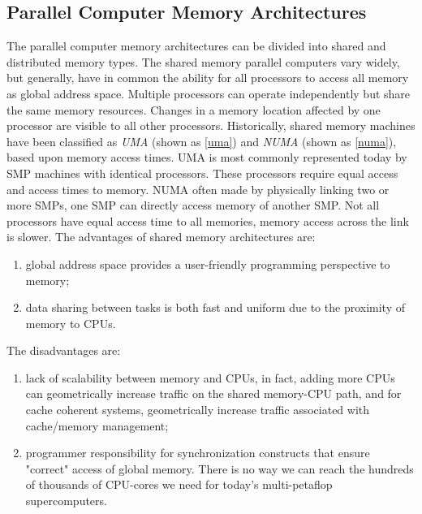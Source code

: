 \subsection{Parallel Computer Memory Architectures}

The parallel computer memory architectures can be divided into shared and distributed memory types. The shared memory parallel computers vary widely, but generally, have in common the ability for all processors to access all memory as global address space. Multiple processors can operate independently but share the same memory resources. Changes in a memory location affected by one processor are visible to all other processors. Historically, shared memory machines have been classified as \textit{UMA} (shown as \ref{uma}) and \textit{NUMA} (shown as \ref{numa}), based upon memory access times. UMA is most commonly represented today by SMP machines with identical processors. These processors require equal access and access times to memory. NUMA often made by physically linking two or more SMPs, one SMP can directly access memory of another SMP. Not all processors have equal access time to all memories, memory access across the link is slower. The advantages of shared memory architectures are: 

\begin{enumerate}
	\item  global address space provides a user-friendly programming perspective to memory; 
	\item  data sharing between tasks is both fast and uniform due to the proximity of memory to CPUs.
\end{enumerate}

The disadvantages are:
\begin{enumerate}
	\item lack of scalability between memory and CPUs, in fact, adding more CPUs can geometrically increase traffic on the shared memory-CPU path, and for cache coherent systems, geometrically increase traffic associated with cache/memory management; 
	\item programmer responsibility for synchronization constructs that ensure "correct" access of global memory. There is no way we can reach the hundreds of thousands of CPU-cores we need for today’s multi-petaflop supercomputers.
\end{enumerate}

